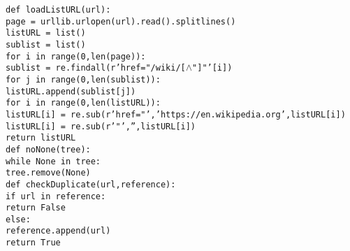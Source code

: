 \documentclass[a4paper]{report}
\begin{document}
\noindent \texttt{def loadListURL(url):}\\
\hspace*{1cm}	\texttt{page = urllib.urlopen(url).read().splitlines()}\\
\hspace*{1cm}	\texttt{listURL = list()}\\
\hspace*{1cm}	\texttt{sublist = list()}\\
\hspace*{1cm}	\texttt{for i in range(0,len(page)):}\\
\hspace*{2cm}		\texttt{sublist = re.findall(r'href="/wiki/[$\wedge$"]\*"'[i])}\\
\hspace*{2cm}		\texttt{for j in range(0,len(sublist)):}\\
\hspace*{3cm}			\texttt{listURL.append(sublist[j])}\\
\hspace*{1cm}	\texttt{for i in range(0,len(listURL)):}\\
\hspace*{2cm}		\texttt{listURL[i] = re.sub(r'href="','https://en.wikipedia.org',listURL[i])}\\
\hspace*{2cm}		\texttt{listURL[i] = re.sub(r'"','',listURL[i])}\\
\hspace*{1cm}	\texttt{return listURL}\\

\noindent \texttt{def noNone(tree):}\\
\hspace*{1cm}	\texttt{while None in tree:}\\
\hspace*{2cm}		\texttt{tree.remove(None)}\\

\noindent \texttt{def checkDuplicate(url,reference):}\\
\hspace*{1cm}	\texttt{if url in reference:}\\
\hspace*{2cm}		\texttt{return False}\\
\hspace*{1cm}	\texttt{else:}\\
\hspace*{2cm}		\texttt{reference.append(url)}\\
\hspace*{2cm}		\texttt{return True}\\
\end{document}
